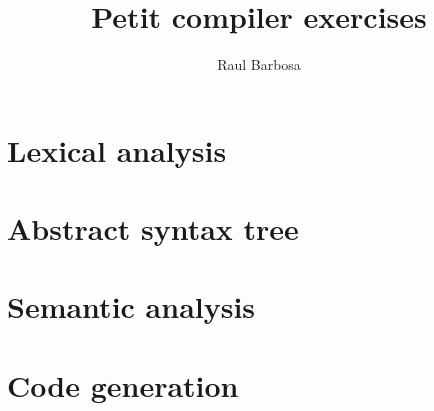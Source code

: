 \documentclass{paper}
\begin{document}
\title{Petit compiler exercises}
\author{Raul Barbosa}
\maketitle

\section{Lexical analysis}


\section{Abstract syntax tree}


\section{Semantic analysis}


\section{Code generation}

\end{document}
